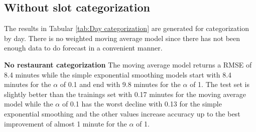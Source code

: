 \subsection{Without slot categorization}
The results in Tabular \ref{tab:Day categorization} are generated for categorization by day. There is no weighted moving average model since there has not been enough data to do forecast in a convenient manner.
\begin{table}[h]
\centering
\caption{Day categorization without slots}
\label{tab:Day categorization}
\end{table}
\newline\newline\textbf{No restaurant categorization}\newline
The moving average model returns a RMSE of 8.4 minutes while the simple exponential smoothing models start with 8.4 minutes for the $\alpha$ of 0.1 and end with 9.8 minutes for the $\alpha$ of 1. The test set is slightly better than the trainings set with 0.17 minutes for the moving average model while the $\alpha$ of 0.1 has the worst decline with 0.13 for the simple exponential smoothing and the other values increase accuracy up to the best improvement of almost 1 minute for the $\alpha$ of 1.\newline
